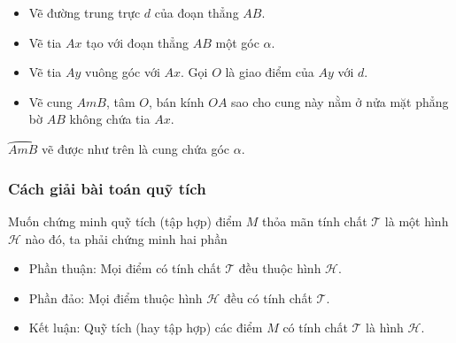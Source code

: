 \begin{itemize}
	\item Vẽ đường trung trực $d$ của đoạn thẳng $AB$.
	\item Vẽ tia $Ax$ tạo với đoạn thẳng $AB$ một góc $\alpha$.
	\item Vẽ tia $Ay$ vuông góc với $Ax$. Gọi $O$ là giao điểm của $Ay$ với $d$.
	\item Vẽ cung $AmB$, tâm $O$, bán kính $OA$ sao cho cung này nằm ở nửa mặt phẳng bờ $AB$ không chứa tia $Ax$.
\end{itemize}
$\wideparen{AmB}$ vẽ được như trên là cung chứa góc $\alpha$.
\subsubsection{Cách giải bài toán quỹ tích}
Muốn chứng minh quỹ tích (tập hợp) điểm $M$ thỏa mãn tính chất $\mathscr{T}$ là một hình $ \mathcal{H} $ nào đó, ta phải chứng minh hai phần
\begin{itemize}	
	\item Phần thuận: Mọi điểm có tính chất $\mathscr{T}$ đều thuộc hình $ \mathcal{H} $.
	\item Phần đảo: Mọi điểm thuộc hình $ \mathcal{H} $ đều có tính chất $\mathscr{T}$.
	\item Kết luận: Quỹ tích (hay tập hợp) các điểm $M$ có tính chất $\mathscr{T}$ là hình $ \mathcal{H} $.
\end{itemize}
